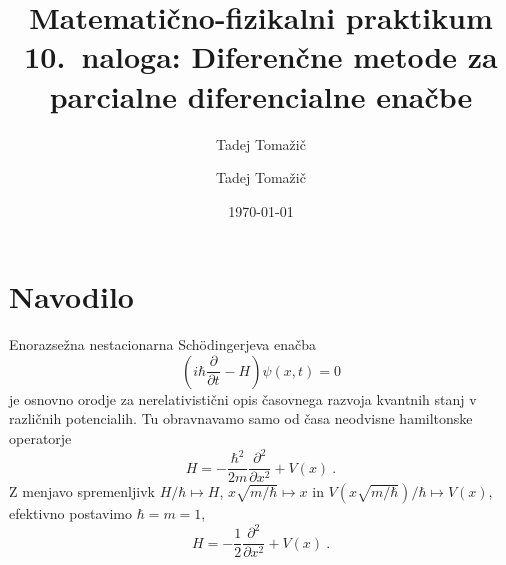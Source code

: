 \documentclass[slovene,11pt,a4paper]{article}
\title{
\sc\large Matematično-fizikalni praktikum \thisyear \\
\bigskip
\bf\Large 10.~naloga: Diferenčne metode za parcialne diferencialne enačbe
}
\author{Tadej Tomažič}
\date{}
\newcommand{\pd}{\partial}
\newcommand{\Pd}[3][{}]{\frac{\pd^{#1} #2}{\pd #3^{#1}}}
\begin{document}
\author{Tadej Tomažič}
\date{\today}

\maketitle

\newpage
{}
\tableofcontents
\listoffigures
\newpage
\vspace{-1cm}
\section{Navodilo}


Enorazsežna nestacionarna Sch\"odingerjeva enačba
\begin{equation*}
  \left(i\hbar\Pd{}{t}-H\right)\psi(x,t)=0
\end{equation*}
je osnovno orodje za nerelativistični opis časovnega razvoja kvantnih stanj v različnih potencialih. Tu obravnavamo samo od časa neodvisne hamiltonske operatorje
\begin{equation*}
  H=-\frac{\hbar^2}{2m}\Pd[2]{}{x}+V(x)\>.
\end{equation*}
Z menjavo spremenljivk $H/\hbar\mapsto H$, $x\sqrt{m/\hbar}\mapsto x$ in $V(x\sqrt{m/\hbar})/\hbar\mapsto V(x)$, efektivno postavimo $\hbar=m=1$,
\begin{equation}
  H=-\frac12\Pd[2]{}{x}+V(x)\>.
  \label{eq:hamilton}
\end{equation}
\end{document}
